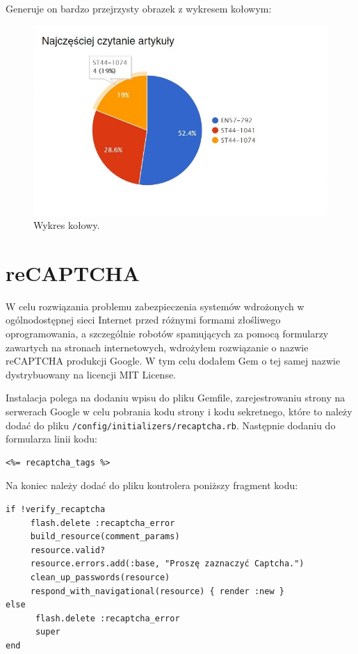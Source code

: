 \documentclass[openright]{xmgr}
\begin{document}
\newpage

Generuje on bardzo przejrzysty obrazek z wykresem kołowym:
\begin{figure}[!tbh]
\centering
\includegraphics[width=.8\linewidth]{fig/chartkick}
\caption{Wykres kołowy.}
\end{figure}

\section{reCAPTCHA}

W celu rozwiązania problemu zabezpieczenia systemów wdrożonych w ogólnodostępnej sieci Internet przed różnymi formami złośliwego oprogramowania, a szczególnie robotów spamujących za pomocą formularzy zawartych na stronach internetowych, wdrożyłem rozwiązanie o nazwie reCAPTCHA produkcji Google. W tym celu dodałem Gem o tej samej nazwie \cite{recaptcha} dystrybuowany na licencji MIT License.

\newpage

Instalacja polega na dodaniu wpisu do pliku Gemfile, zarejestrowaniu strony na serwerach Google w celu pobrania kodu strony i kodu sekretnego, które to należy dodać do pliku \texttt{/config/initializers/recaptcha.rb}. Następnie dodaniu do formularza linii kodu:
\begin{lstlisting}[language=ruby2, caption={Kod wyświetlający formularz reCAPTCHA}]
<%= recaptcha_tags %>
\end{lstlisting}
Na koniec należy dodać do pliku kontrolera poniższy fragment kodu:
\begin{lstlisting}[language=ruby2, caption={Kod kontrolera weryfikujący reCAPTCHA}]
if !verify_recaptcha
     flash.delete :recaptcha_error
     build_resource(comment_params)
     resource.valid?
     resource.errors.add(:base, "Proszę zaznaczyć Captcha.")
     clean_up_passwords(resource)
     respond_with_navigational(resource) { render :new }
else
      flash.delete :recaptcha_error
      super
end
\end{lstlisting}
\end{document}
